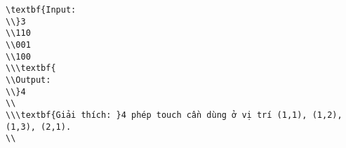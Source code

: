 \begin{verbatim}
\textbf{Input:
\\}3
\\110 
\\001
\\100
\\\textbf{
\\Output:
\\}4
\\
\\\textbf{Giải thích: }4 phép touch cần dùng ở vị trí (1,1), (1,2), (1,3), (2,1).
\\\end{verbatim}
